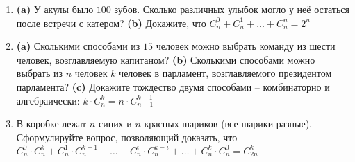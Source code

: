 \documentclass{article}
\begin{document}
\begin{enumerate}[label*=\protect\fbox{\arabic{enumi}}]
\item \textbf{(a)} У акулы было $100$ зубов. Сколько различных улыбок могло у неё остаться после встречи
с катером? \textbf{(b)} Докажите, что $C^0_n + C^1_n + ... + C^n_n = 2^n$

\item \textbf{(a)} Сколькими способами из $15$ человек можно выбрать команду из шести человек, возглавляемую капитаном? \textbf{(b)} Сколькими способами можно выбрать из $n$ человек $k$ человек в парламент, возглавляемого президентом парламента? \textbf{(c)} Докажите тождество двумя способами – комбинаторно и алгебраически: $k \cdot C^k_n = n \cdot C^{k-1}_{n-1}$

\item В коробке лежат $n$ синих и $n$ красных шариков (все шарики разные). Сформулируйте
вопрос, позволяющий доказать, что $C^0_n \cdot C^k_n +C^1_n \cdot C^{k-1}_n+\dotso+C^i_n \cdot C^{k-i}_n +\dotso + C^k_n \cdot C^0_n =C^k_{2n}$
\end{enumerate}
\end{document}
